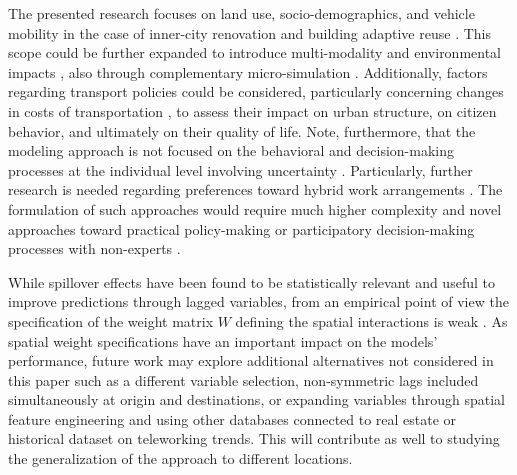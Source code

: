 The presented research focuses on land use, socio-demographics, and vehicle mobility in the case of inner-city renovation and building adaptive reuse \citep{Remy2014}. This scope could be further expanded to introduce multi-modality and environmental impacts \citep{Wegener2021Land-UseModels, Acheampong2015, Rodriguez-Rey2022ToQuality}, also through complementary micro-simulation \citep{ArgotaSanchez-Vaquerizo2023LessCity-making}. Additionally, factors regarding transport policies could be considered, particularly concerning changes in costs of transportation \citep{Guzman2014OptimalScheme}, to assess their impact on urban structure, on citizen behavior, and ultimately on their quality of life. Note, furthermore, that the modeling approach %
is not focused on the behavioral and decision-making processes at the individual level involving uncertainty \citep{Rasouli2014ApplicationsResearch}. Particularly, further research is needed regarding preferences toward hybrid work arrangements \citep{Heimgartner2024HybridFrequencies}. 
The formulation of such approaches would require much higher complexity \citep{Acheampong2015} and novel approaches toward practical policy-making or participatory decision-making processes with non-experts \citep{Carteni2022ALevels}.

While spillover effects have been found to be statistically relevant and useful to improve predictions through lagged variables, from an empirical point of view the specification of the weight matrix $W$ defining the spatial interactions is weak \citep{Costantino2023AItaly}. As spatial weight specifications have an important impact on the models' performance, future work may explore additional alternatives not considered in this paper such as a different variable selection, non-symmetric lags included simultaneously at origin and destinations, or expanding variables through spatial feature engineering and using other databases connected to real estate or historical dataset on teleworking trends. This will contribute as well to studying the generalization of the approach to different locations. 

